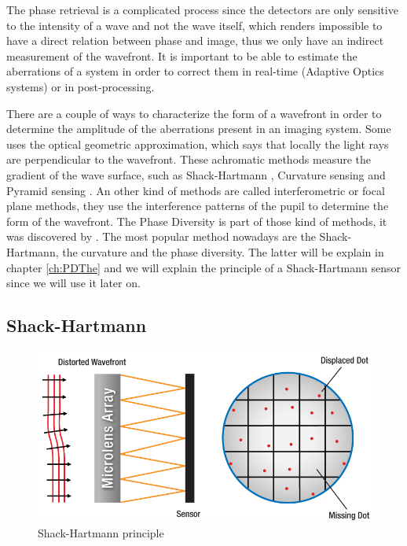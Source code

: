 The phase retrieval is a complicated process since the detectors are only sensitive to the intensity of a wave and not the wave itself, which renders impossible to have a direct relation between phase and image, thus we only have an indirect measurement of the wavefront. It is important to be able to estimate the aberrations of a system in order to correct them in real-time (Adaptive Optics systems) or in post-processing.

There are a couple of ways to characterize the form of a wavefront in order to determine the amplitude of the aberrations present in an imaging system. Some uses the optical geometric approximation, which says that locally the light rays are perpendicular to the wavefront. These achromatic methods measure the gradient of the wave surface, such as Shack-Hartmann \citep{hartmann1900,ShackPlatt_1971,fontanella1985}, Curvature sensing \citep{Roddier1988} and Pyramid sensing \citep{ragazzoni1996}. An other kind of methods are called interferometric or focal plane methods, they use the interference patterns of the pupil to determine the form of the wavefront. The Phase Diversity is part of those kind of methods, it was discovered by \citet{GerchberSaxton1972,Gonsalve_1982}. The most popular method nowadays are the Shack-Hartmann, the curvature and the phase diversity. The latter will be explain in chapter \ref{ch:PDThe} and we will explain the principle of a Shack-Hartmann sensor since we will use it later on.


\subsection[Shack-Hartmann]{Shack-Hartmann \citep{hartmann1900,ShackPlatt_1971}}

\begin{figure}
\begin{center}
\includegraphics[width=\textwidth,angle=0]{Figures/SHWFSPrinciple}
\decoRule
\caption[Shack-Hartmann principle]{Shack-Hartmann principle \citep{SHWFS}}
\label{fig:SHWFSPrinciple}
\end{center}
\end{figure}

